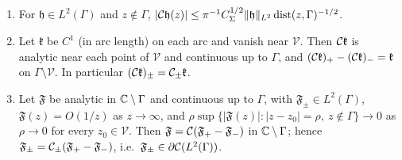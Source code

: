 \begin{lemma}\label{lem:B-cauchy}
\begin{enumerate}
\item[(a)] For $\mathfrak h\in L^2(\Gamma)$ and $z\notin\Gamma$, $|\mathcal{C}\mathfrak h(z)|\le\pi^{-1}C_\Sigma^{1/2}\|\mathfrak h\|_{L^2}\,
  \mathrm{dist}(z,\Gamma)^{-1/2}$.
\item[(b)] Let $\mathfrak k$ be $C^1$ (in arc length) on each arc and vanish near $\mathcal V$. Then $\mathcal{C}\mathfrak k$ is
  analytic near each point of $\mathcal V$ and continuous up to $\Gamma$, and $(\mathcal{C}\mathfrak k)_+-(\mathcal{C}\mathfrak
  k)_-=\mathfrak k$ on $\Gamma\setminus\mathcal V$. In particular $(\mathcal{C}\mathfrak k)_\pm=\mathcal{C}_\pm\mathfrak k$.
\item[(c)] Let $\mathfrak F$ be analytic in $\mathbb{C}\setminus\Gamma$ and continuous up to $\Gamma$, with $\mathfrak F_\pm\in L^2(\Gamma)$,
  $\mathfrak F(z)=O(1/z)$ as $z\to\infty$, and $\rho\sup\{|\mathfrak F(z)|:|z-z_0|=\rho,\ z\notin\Gamma\}\to0$ as $\rho\to0$ for every
  $z_0\in\mathcal V$. Then $\mathfrak F=\mathcal{C}(\mathfrak F_+-\mathfrak F_-)$ in $\mathbb{C}\setminus\Gamma$; hence $\mathfrak F_\pm=\mathcal{C}_\pm(\mathfrak F_+-\mathfrak F_-)$, i.e.\
  $\mathfrak F_\pm\in\partial\mathcal{C}(L^2(\Gamma))$.
\end{enumerate}
\end{lemma}


